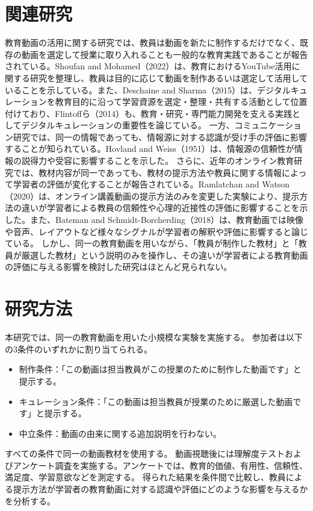 \documentclass[a4paper,10pt]{ltjsarticle}
\begin{document}
\section{関連研究}

教育動画の活用に関する研究では、教員は動画を新たに制作するだけでなく、既存の動画を選定して授業に取り入れることも一般的な教育実践であることが報告されている。Shoufan and Mohamed（2022）は、教育におけるYouTube活用に関する研究を整理し、教員は目的に応じて動画を制作あるいは選定して活用していることを示している。また、Deschaine and Sharma（2015）は、デジタルキュレーションを教育目的に沿って学習資源を選定・整理・共有する活動として位置付けており、Flintoffら（2014）も、教育・研究・専門能力開発を支える実践としてデジタルキュレーションの重要性を論じている。
一方、コミュニケーション研究では、同一の情報であっても、情報源に対する認識が受け手の評価に影響することが知られている。Hovland and Weiss（1951）は、情報源の信頼性が情報の説得力や受容に影響することを示した。
さらに、近年のオンライン教育研究では、教材内容が同一であっても、教材の提示方法や教員に関する情報によって学習者の評価が変化することが報告されている。Ramlatchan and Watson（2020）は、オンライン講義動画の提示方法のみを変更した実験により、提示方法の違いが学習者による教員の信頼性や心理的近接性の評価に影響することを示した。また、Bateman and Schmidt-Borcherding（2018）は、教育動画では映像や音声、レイアウトなど様々なシグナルが学習者の解釈や評価に影響すると論じている。
しかし、同一の教育動画を用いながら、「教員が制作した教材」と「教員が厳選した教材」という説明のみを操作し、その違いが学習者による教育動画の評価に与える影響を検討した研究はほとんど見られない。


\section{研究方法}

本研究では、同一の教育動画を用いた小規模な実験を実施する。
参加者は以下の3条件のいずれかに割り当てられる。

\begin{itemize}
  \item 制作条件：「この動画は担当教員がこの授業のために制作した動画です」と提示する。
  \item キュレーション条件：「この動画は担当教員が授業のために厳選した動画です」と提示する。
  \item 中立条件：動画の由来に関する追加説明を行わない。
\end{itemize}

すべての条件で同一の動画教材を使用する。
動画視聴後には理解度テストおよびアンケート調査を実施する。アンケートでは、教育的価値、有用性、信頼性、満足度、学習意欲などを測定する。
得られた結果を条件間で比較し、教員による提示方法が学習者の教育動画に対する認識や評価にどのような影響を与えるかを分析する。
\end{document}
